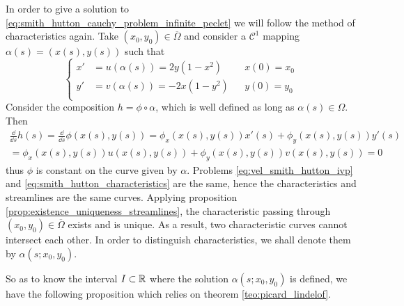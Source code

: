 In order to give a solution to
\eqref{eq:smith_hutton_cauchy_problem_infinite_peclet} we will follow the method
of characteristics again. Take $(x_0, y_0) \in \overline{\Omega}$ and consider a
$\mathcal{C}^1$ mapping $\alpha(s) = (x(s), y(s))$ such that
\begin{equation} \label{eq:smith_hutton_characteristics}
	\left\{
		\begin{aligned}
			x' &= u(\alpha(s)) = 2 y (1 - x^2) 		& &x(0) = x_0 \\
			y' &= v(\alpha(s)) = - 2 x (1 - y^2) 	& &y(0) = y_0 \\
		\end{aligned}
	\right.
\end{equation}
Consider the composition $h = \phi \circ \alpha$, which is well defined as long
as $\alpha(s) \in \Omega$. Then
\begin{multline*}
	\frac{\dd}{\dd{s}} h(s) = 
	\frac{\dd}{\dd{s}} \phi(x(s), y(s)) = 
	\phi_x(x(s), y(s)) x'(s) + \phi_y(x(s), y(s)) y'(s) \\ =
	\phi_x(x(s), y(s)) u(x(s), y(s)) + 
	\phi_y(x(s), y(s)) v(x(s), y(s)) = 0
\end{multline*}
thus $\phi$ is constant on the curve given by $\alpha$. Problems
\eqref{eq:vel_smith_hutton_ivp} and \eqref{eq:smith_hutton_characteristics} are
the same, hence the characteristics and streamlines are the same curves.
Applying proposition \eqref{prop:existence_uniqueness_streamlines}, the
characteristic passing through $(x_0, y_0) \in \overline{\Omega}$ exists and is
unique. As a result, two characteristic curves cannot intersect each other. In
order to distinguish characteristics, we shall denote them by
$\alpha(s;x_0,y_0)$. 

So as to know the interval $I \subset \mathbb{R}$ where the solution
$\alpha(s;x_0,y_0)$ is defined, we have the following proposition which relies
on theorem \ref{teo:picard_lindelof}.

